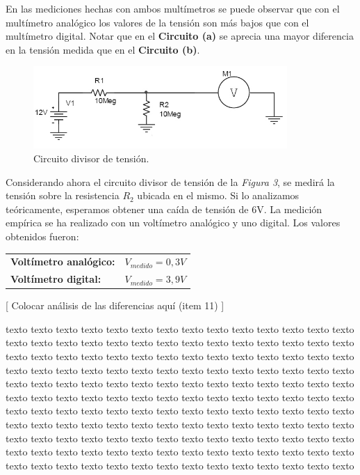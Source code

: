 \documentclass{article}
\begin{document}
	En las mediciones hechas con ambos multímetros se puede observar que con el multímetro analógico los valores de la tensión son más bajos que con el multímetro digital. Notar que en el \textbf{Circuito (a)} se aprecia una mayor diferencia en la tensión medida que en el 
 \textbf{Circuito (b)}.

\bigskip


\begin{figure}[h]
	\centering
	\includegraphics[width=0.86\textwidth]{images/p1-item-8.jpg}
	\caption{Circuito divisor de tensión.}
\end{figure}
\bigskip


	Considerando ahora el circuito divisor de tensión de la \textit{Figura 3}, se medirá la tensión sobre la resistencia $R_2$ ubicada en el mismo. Si lo analizamos teóricamente, esperamos obtener una caída de tensión de 6V. La medición empírica se ha realizado con un voltímetro analógico y uno digital. Los valores obtenidos fueron:
\bigskip\medskip

\begin{tabular}{l l}
	\textbf{Voltímetro analógico:} & $V_{medido} = 0,3V$ \smallskip\\
	\textbf{Voltímetro digital:} & $V_{medido} = 3,9V$ \\
\end{tabular}
\bigskip\bigskip

[ Colocar análisis de las diferencias aquí (item 11) ]

texto texto texto texto texto texto texto texto texto texto texto texto texto texto texto texto texto texto texto texto texto texto texto texto texto texto texto texto texto texto texto texto texto texto texto texto texto texto texto texto texto texto texto texto texto texto texto texto texto texto texto texto texto texto texto texto texto texto texto texto texto texto texto texto texto texto texto texto texto texto texto texto texto texto texto texto texto texto texto texto texto texto texto texto texto texto texto texto texto texto texto texto texto texto texto texto texto texto texto texto texto texto texto texto texto texto texto texto texto texto texto texto texto texto texto texto texto texto texto texto texto texto texto texto texto texto texto texto texto texto texto texto texto texto texto texto texto texto texto texto texto texto texto texto texto texto texto texto texto texto texto texto texto texto 
\bigskip\bigskip
\end{document}
